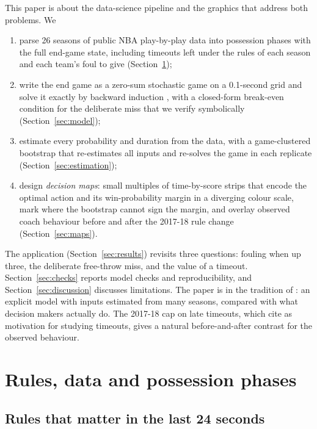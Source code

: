 \documentclass[article]{jdssv}
\begin{document}
This paper is about the data-science pipeline and the graphics that address both problems. We
\begin{enumerate}
\item parse 26 seasons of public NBA play-by-play data into possession phases with the full end-game state,
      including timeouts left under the rules of each season and each team's foul to give (Section~\ref{sec:data});
\item write the end game as a zero-sum stochastic game \citep{Shapley1953} on a 0.1-second grid and solve it
      exactly by backward induction \citep{Bellman1957}, with a closed-form break-even condition for the
      deliberate miss that we verify symbolically (Section~\ref{sec:model});
\item estimate every probability and duration from the data, with a game-clustered bootstrap that re-estimates all inputs and
      re-solves the game in each replicate (Section~\ref{sec:estimation});
\item design \emph{decision maps}: small multiples of time-by-score strips that encode the optimal action and
      its win-probability margin in a diverging colour scale, mark where the bootstrap cannot sign the margin,
      and overlay observed coach behaviour before and after the 2017-18 rule change (Section~\ref{sec:maps}).
\end{enumerate}
The application (Section~\ref{sec:results}) revisits three questions: fouling when up three, the deliberate
free-throw miss, and the value of a timeout. Section~\ref{sec:checks} reports model checks and
reproducibility, and Section~\ref{sec:discussion} discusses limitations. The paper is in the tradition of
\citet{Romer2006}: an explicit model with inputs estimated from many seasons, compared with what decision
makers actually do. The 2017-18 cap on late timeouts, which \citet{Gibbs2022} cite as motivation for
studying timeouts, gives a natural before-and-after contrast for the observed behaviour.

\section{Rules, data and possession phases} \label{sec:data}

\subsection{Rules that matter in the last 24 seconds}
\end{document}

